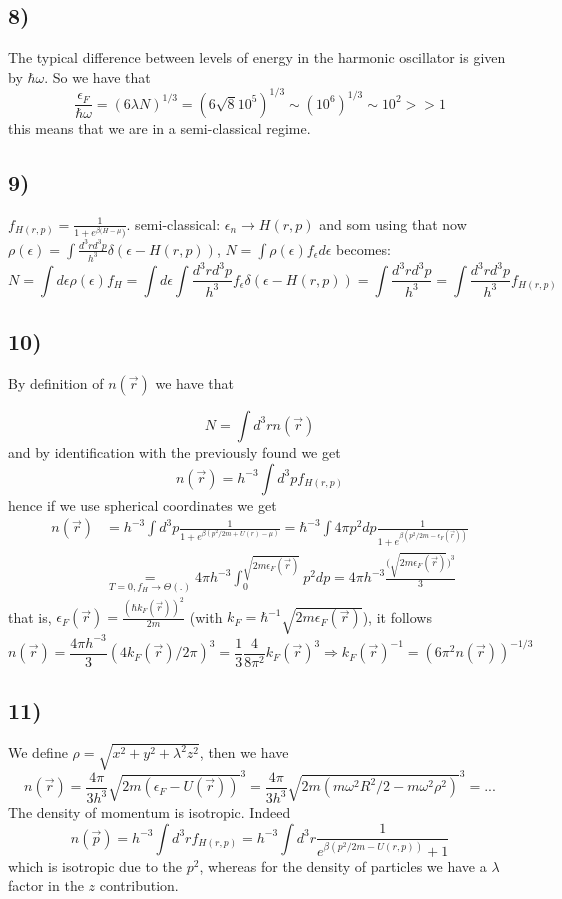 \documentclass[10pt,a4paper]{book}
\begin{document}
\subsection*{8)}
The typical difference between levels of energy in the harmonic oscillator is given by $\hbar \omega$. So we have that
$$ \frac{\epsilon_F}{\hbar\omega}=(6\lambda N)^{1/3}=(6\sqrt{8} 10^5)^{1/3}\sim (10^6)^{1/3}\sim 10^2>>1$$ this means that we are in a semi-classical regime. 

\subsection*{9)}
$f_{H(r,p)}=\frac{1}{1+e^{\beta( H-\mu})}$. semi-classical: $\epsilon_n\to H(r,p)$ and som using that now $\rho(\epsilon)=\int\frac{d^3rd^3p}{h^3}\delta(\epsilon-H(r,p))$, $N=\int\rho(\epsilon)f_{\epsilon}d\epsilon$  becomes:
$$N=\int d\epsilon\rho(\epsilon)f_H=\int d\epsilon\int\frac{d^3rd^3p}{h^3}f_{\epsilon}\delta(\epsilon-H(r,p))=\int\frac{d^3rd^3p}{h^3}=\int\frac{d^3rd^3p}{h^3}f_{H(r,p)}$$


\subsection*{10)}
By definition of $n(\vec{r})$ we have that

$$N=\int d^3r n(\vec{r})$$
and by identification with the previously found we get 
$$n(\vec{r})=h^{-3}\int d^3pf_{H(r,p)}$$
hence if we use spherical coordinates we get 
\begin{align*}
n(\vec{r})&=h^{-3}\int d^3p\frac{1}{1+e^{\beta(p^2/2m+U(r)-\mu)}}=\hbar^{-3}\int 4\pi p^2dp\frac{1}{1+e^{\beta(p^2/2m-\epsilon_F(\vec{r}))}}
\\
&\underset{T=0,f_H\to\Theta(.)}{=}4\pi h^{-3}\int_0^{\sqrt{2m\epsilon_F(\vec{r})}}p^2 dp=4\pi h^{-3}\frac{\big(\sqrt{2m\epsilon_F(\vec{r})}\big)^3}{3}
\end{align*} that is, $\epsilon_F(\vec{r})=\frac{(\hbar k_F(\vec{r}))^2}{2m}$ (with $k_F=\hbar^{-1}\sqrt{2m\epsilon_F(\vec{r})}$), it follows 
$$n(\vec{r})=\frac{4\pi h^{-3}}{3}(4k_F(\vec{r})/2\pi)^3=\frac{1}{3}\frac{4}{8\pi^2}k_F(\vec{r})^3\Rightarrow k_F(\vec{r})^{-1}=(6\pi^2 n(\vec{r}))^{-1/3}$$


\subsection*{11)}
We define $\rho=\sqrt{x^2+y^2+\lambda^2 z^2}$, then we have
$$n(\vec{r})=\frac{4\pi}{3h^3}\sqrt{2m(\epsilon_F-U(\vec{r}))}^3=\frac{4\pi}{3h^3}\sqrt{2m(m\omega^2 R^2/2-m\omega^2\rho^2)}^3=...$$
The density of momentum is isotropic. Indeed
$$n(\vec{p})=h^{-3}\int d^3rf_{H(r,p)}=h^{-3}\int d^3r\frac{1}{e^{\beta(p^2/2m-U(r,p))}+1}$$ which is isotropic due to the $p^2$, whereas for the density of particles we have a $\lambda$ factor in the $z$ contribution.
\end{document}
